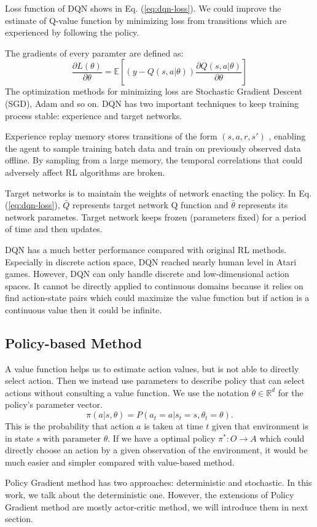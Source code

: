 \documentclass[11pt,twocolumn]{jarticle} %
\begin{document}
Loss function of DQN shows in Eq. (\ref{eq:dqn-loss}). We could improve the estimate of Q-value function by minimizing loss from transitions which are experienced by following the policy. \par
The gradients of every paramter are defined as:
\begin{equation}
\frac{\partial L(\theta)}{\partial \theta} = \mathbb{E}[(y - Q(s, a|\theta))\frac{\partial Q(s, a|\theta)}{\partial \theta}]
\end{equation}
The optimization methods for minimizing loss are Stochastic Gradient Descent (SGD), Adam\cite{adam} and so on.
DQN has two important techniques to keep training process stable: experience and target networks.\par
Experience replay\cite{replay} memory stores transitions of the form $(s,a,r,s')$ , enabling the agent to sample training batch data and train on previously observed data offline. By sampling from a large memory, the temporal correlations that could adversely affect RL algorithms are broken. \par
Target networks\cite{qlearning} is to maintain the weights of network enacting the policy. In Eq. (\ref{eq:dqn-loss}), $\bar{Q}$ represents target network Q function and $\bar{\theta}$ represents its network parametes. Target network keeps frozen (parameters fixed) for a period of time and then updates. \par

DQN has a much better performance compared with original RL methods. Especially in discrete action space, DQN reached nearly human level in Atari games. However, DQN can only handle discrete and low-dimensional action spaces. It cannot be directly applied to continuous domains because it relies on find action-state pairs which could maximize the value function but if action is a continuous value then it could be infinite. \par

\subsection{Policy-based Method}
A value function helps us to estimate action values, but is not able to directly select action. Then we instead use parameters to describe policy that can select actions without consulting a value function. We use the notation $\theta \in \mathbb{R}^d$ for the policy's parameter vector.
\begin{equation}
\pi(a|s, \theta) = P(a_t = a | s_t = s, \theta_t = \theta). 
\end{equation}
This is the probability that action $a$ is taken at time $t$ given that environment is in state $s$ with parameter $\theta$.
If we have a optimal policy $\pi^*: O \rightarrow A$ which could directly choose an action by a given observation of the environment, it would be much easier and simpler compared with value-based method. \par
Policy Gradient method has two approaches: deterministic and stochastic. In this work, we talk about the deterministic one.
However, the extensions of Policy Gradient method are mostly actor-critic method, we will introduce them in next section. 
\end{document}

